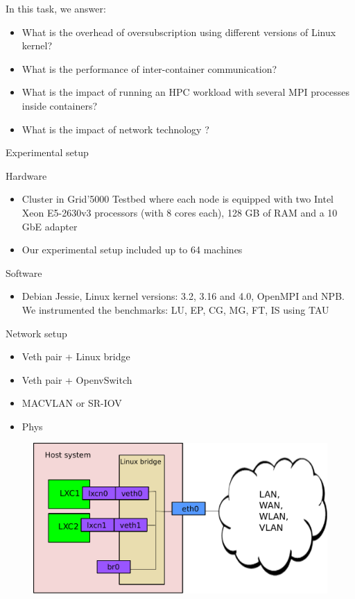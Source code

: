 \documentclass[11pt,xcolor=dvipsnames,presentation]{beamer}
\begin{document}
\begin{frame}[label=sec-3-0-5]{In this task, we answer:}
\begin{itemize}
\item What is the overhead of oversubscription using different versions of Linux kernel?
\item What is the performance of inter-container communication?
\item What is the impact of running an HPC workload with several MPI processes inside containers?
\item What is the impact of network technology ?
\end{itemize}
\end{frame}

\begin{frame}[label=sec-3-0-6]{Experimental setup}
\begin{block}{Hardware}
\begin{itemize}
\item Cluster in Grid'5000 Testbed where each node is equipped
with two Intel Xeon E5-2630v3 processors (with 8 cores each), 128 GB of RAM and a 10 GbE adapter
\item Our experimental setup included up to 64 machines
\end{itemize}
\end{block}

\begin{block}{Software}
\begin{itemize}
\item Debian Jessie, Linux kernel versions: 3.2, 3.16 and 4.0, OpenMPI and NPB.
We instrumented the benchmarks: LU, EP, CG, MG, FT, IS using TAU
\end{itemize}
\end{block}
\end{frame}


\begin{frame}[label=sec-3-0-7]{Network setup}
\begin{itemize}
\item \alert{Veth pair + Linux bridge}
\item Veth pair + OpenvSwitch
\item MACVLAN or SR-IOV
\item Phys
\end{itemize}

\begin{figure}[!h]
  \center
  \includegraphics[scale=0.4]{figures/lxc-veth.pdf}
  \label{fig:hpc}
\end{figure}
\end{frame}
\end{document}
